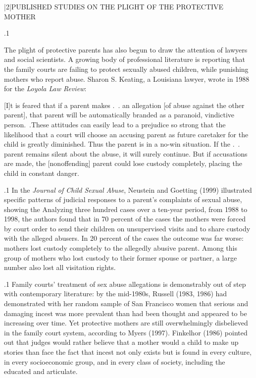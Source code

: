 \documentclass[11pt, twoside]{article}
\begin{document}
{\s|2|{PUBLISHED STUDIES ON THE PLIGHT OF THE PROTECTIVE MOTHER}

\p.1{%
\noindent{}\:The plight of protective parents has also begun to draw the attention of
lawyers and social scientists. A growing body of professional literature
is reporting that the family courts are failing to protect sexually abused
children, while punishing mothers who report abuse. Sharon S. Keating,
a Louisiana lawyer, wrote in 1988 for the \textit{Loyola Law Review}:

\begin{blockQuote}
{[I]}t is feared that if a parent makes .~. an allegation [of abuse against
the other parent], that parent will be automatically bran\-ded as a
paranoid, vindictive person.~.\@ These attitudes can easily lead to
a prejudice so strong that the likelihood that a court will choose
an accusing parent as future caretaker for the child is greatly diminished. Thus the parent is in a no-win situation. If the .~. parent
remains silent about the abuse, it will surely continue. But if accusations are made, the [nonoffending] parent could lose custody
completely, placing the child in constant danger.
\end{blockQuote}
\;
}%

\p.1{%
\:In the \textit{Journal of Child Sexual Abuse}, Neustein and Goetting (1999)
illustrated specific patterns of judicial responses to a 
parent’s complaints of sexual abuse, showing the  Analyzing three hundred cases over a ten-year period, from
1988 to 1998, the authors found that in 70 percent of the cases the
mothers were forced by court order to send their children on unsupervised visits and to share custody with the alleged abusers. In 20 percent
of the cases the outcome was far worse: mothers lost custody completely
to the allegedly abusive parent. Among this group of mothers who lost
custody to their former spouse or partner, a large number also lost all
visitation rights.\;
}%

\p.1{%
\:Family courts’ treatment of sex abuse allegations is demonstrably
out of step with contemporary literature: by the mid-1980s, Russell
(1983, 1986) had demonstrated with her random sample of San Francisco women that serious and damaging incest was more prevalent than
had been thought and appeared to be increasing over time. Yet protective mothers are still overwhelmingly disbelieved in the family court
system, according to Myers (1997). Finkelhor (1986) pointed out that
judges would rather believe that a mother would  a child to
make up stories than face the fact that incest not only exists but is found
in every culture, in every socioeconomic group, and in every class of
society, including the educated and articulate.\;
}%

}
\end{document}
